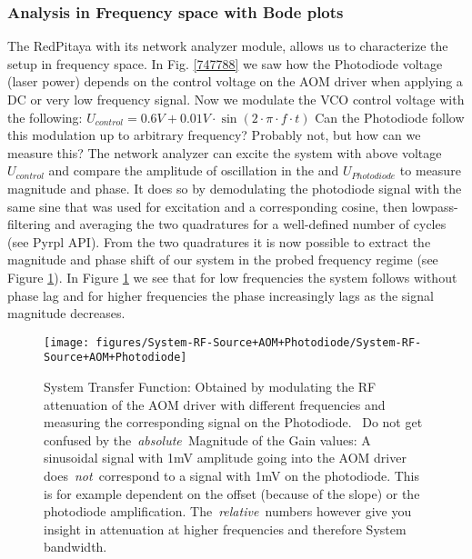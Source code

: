 \documentclass[10pt]{article}
\begin{document}
\subsubsection{Analysis in Frequency space with Bode
plots}\label{analysis-in-frequency-space-with-bode-plots}

The RedPitaya with its network analyzer module, allows us to
characterize the setup in frequency space. In Fig. \ref{747788} we saw
how the Photodiode voltage (laser power) depends on the control voltage
on the AOM driver when applying a DC or very low frequency signal. Now
we modulate the VCO control voltage with the following:
\(U_{control}=0.6V+0.01V\cdot\sin\left(2\cdot\pi\cdot f\cdot t\right)\) Can the Photodiode follow this modulation up to
arbitrary frequency? Probably not, but how can we measure this? The
network analyzer can excite the system with above voltage
\(U_{control}\) and compare the amplitude of oscillation in the and
\(U_{Photodiode}\) to measure magnitude and phase. It does so by
demodulating the photodiode signal with the same sine that was used for
excitation and a corresponding cosine, then lowpass-filtering and
averaging the two quadratures for a well-defined number of cycles (see
Pyrpl API). From the two quadratures it is now possible to extract the
magnitude and phase shift of our system in the probed frequency regime
(see Figure \ref{852375}). In Figure \ref{852375} we see that for low
frequencies the system follows without phase lag and for higher
frequencies the phase increasingly lags as the signal magnitude
decreases.
\begin{figure}[h!]
\begin{center}
\texttt{[image: figures/System-RF-Source+AOM+Photodiode/System-RF-Source+AOM+Photodiode]}
\caption{{System Transfer Function: Obtained by modulating the RF attenuation of
the AOM driver with different frequencies and measuring the
corresponding signal on the Photodiode.~ Do not get confused by
the~\emph{absolute~}Magnitude of the Gain values: A sinusoidal signal
with 1mV amplitude going into the AOM driver does~\emph{not~}correspond
to a signal with 1mV on the photodiode. This is for example dependent on
the offset (because of the slope) or the photodiode amplification.
The~\emph{relative~}numbers however give you insight in attenuation at
higher frequencies and therefore System bandwidth.
{\label{852375}}%
}}
\end{center}
\end{figure}
\end{document}
